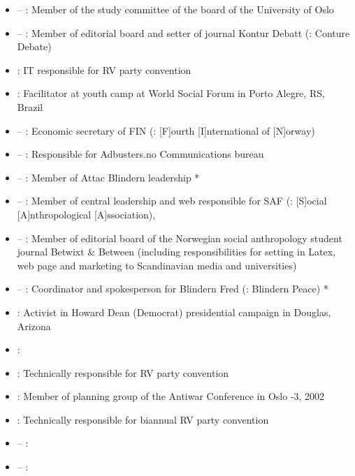 \begin{itemize}
\item {} – : Member of the study committee of the board of the University of Oslo
\item {} – : Member of editorial board and setter of journal Kontur Debatt (\english: Conture Debate)
\item {}: IT responsible for RV party convention
\item {}: Facilitator at youth camp at World Social Forum in Porto Alegre, RS, Brazil
\item {} – : Economic secretary of FIN (\english: [F]ourth [I]nternational of [N]orway)
\item {} – : Responsible for Adbusters.no Communications bureau
\item {} –  : Member of Attac Blindern leadership *
\item {} – : Member of central leadership and web responsible for SAF (\english: [S]ocial [A]nthropological [A]ssociation), \uio
\item {} – : Member of editorial board of the Norwegian social anthropology student journal Betwixt \& Between
(including responsibilities for setting in Latex, web page and marketing to Scandinavian media and universities)
\item {} –  : Coordinator and spokesperson for Blindern Fred (\english: Blindern Peace) *
\item {}: Activist in Howard Dean (Democrat) presidential campaign in Douglas, Arizona
\item {}: 
\item {}: Technically responsible for RV party convention
\item {}: Member of planning group of the Antiwar Conference in Oslo -3, 2002
\item {}: Technically responsible for biannual RV party convention
\item {} – : 
\item {} – : 

\end{itemize}
